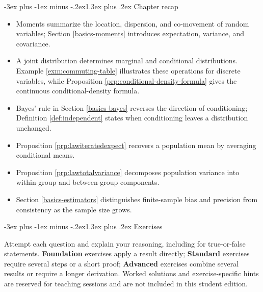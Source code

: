 \documentclass[
  11pt,
]{book}
\makeatletter
\providecommand{\tightlist}{%
  \setlength{\itemsep}{0pt}\setlength{\parskip}{0pt}}
\renewcommand\section{\@startsection{section}{1}{\z@}
  {-3ex plus -1ex minus -.2ex}{1.3ex plus .2ex}
  {\normalfont\Large\bfseries\color{TextbookInk}}}
\theoremstyle{definition}
\theoremstyle{definition}
\theoremstyle{definition}
\theoremstyle{definition}
\theoremstyle{remark}
\makeatother
\begin{document}

\section{Chapter recap}\label{basics-recap}

\begin{recapbox}

\begin{itemize}
\tightlist
\item
  Moments summarize the location, dispersion, and co-movement of random variables; Section \ref{basics-moments} introduces expectation, variance, and covariance.
\item
  A joint distribution determines marginal and conditional distributions. Example \ref{exm:commuting-table} illustrates these operations for discrete variables, while Proposition \ref{prp:conditional-density-formula} gives the continuous conditional-density formula.
\item
  Bayes' rule in Section \ref{basics-bayes} reverses the direction of conditioning; Definition \ref{def:independent} states when conditioning leaves a distribution unchanged.
\item
  Proposition \ref{prp:lawiteratedexpect} recovers a population mean by averaging conditional means.
\item
  Proposition \ref{prp:lawtotalvariance} decomposes population variance into within-group and between-group components.
\item
  Section \ref{basics-estimators} distinguishes finite-sample bias and precision from consistency as the sample size grows.
\end{itemize}

\end{recapbox}

\clearpage

\section{Exercises}\label{basics-exercises}

Attempt each question and explain your reasoning, including for true-or-false statements. \textbf{Foundation} exercises apply a result directly; \textbf{Standard} exercises require several steps or a short proof; \textbf{Advanced} exercises combine several results or require a longer derivation. Worked solutions and exercise-specific hints are reserved for teaching sessions and are not included in this student edition.
\end{document}
